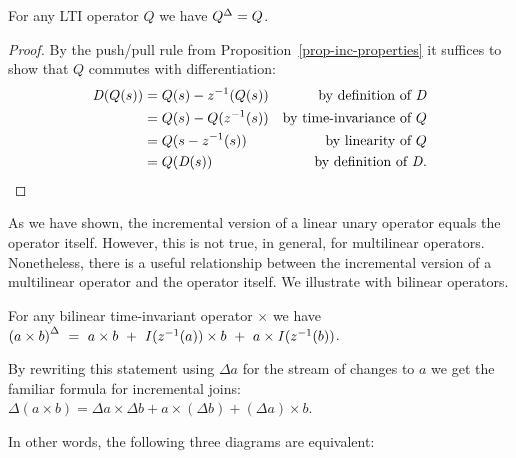 
\begin{theorem}[Linear]\label{linear}
For any LTI operator $Q$ we have ${Q}^{\Delta}=Q$.
\end{theorem}

\begin{proof}
By the push/pull rule from Proposition~\ref{prop-inc-properties}
it suffices to show that $Q$ commutes with differentiation:
$$
\begin{aligned}
  \mathit{D}(Q(s)) &= Q(s)-z^{-1}(Q(s)) & \mbox{by definition of }\mathit{D} \\
  &= Q(s)-Q(z^{-1}(s)) & \mbox{by time-invariance of }Q \\
  &= Q(s-z^{-1}(s)) & \mbox{by linearity of }Q \\
  &= Q(\mathit{D}(s)) & \mbox{by definition of }\mathit{D}.
\end{aligned}
$$
\end{proof}


As we have shown, the incremental version of a linear unary operator equals the operator itself.
However, this is not true, in general, for multilinear operators. Nonetheless, there is a useful relationship
between the incremental version of a multilinear operator and the operator itself. We illustrate with bilinear
operators.
\begin{comment}
\val{Such as join. from incremental maintenance literature recall the definition of "delta" for join:
$\Delta(R\bowtie S) = R\bowtie(\Delta S) \cup (\Delta R)\bowtie S \cup (\Delta R)\bowtie(\Delta S)$.}
\mihai{Indeed, the join is the main application.  Should we hint at this?  It's the first
time the relational algebra will appear in this text.}
\end{comment}

\begin{theorem}[Bilinear]\label{bilinear}
For any bilinear time-invariant operator $\times$ we have
${(a \times b)}^{\Delta} ~=~ a \times b ~+~ \mathit{I}(z^{-1}(a)) \times b ~+~ a \times \mathit{I}(z^{-1}(b))$.
\end{theorem}

By rewriting this statement using $\Delta a$ for the stream of changes to $a$ we
get the familiar formula for incremental joins:
$\Delta(a\times b) =\Delta a \times \Delta b + a\times(\Delta b) + (\Delta a)\times b$.

In other words, the following three diagrams are equivalent:

